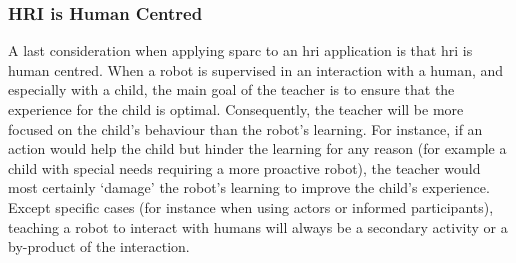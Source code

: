 \subsubsection{HRI is Human Centred}

A last consideration when applying \gls{sparc} to an \gls{hri} application is that \gls{hri} is human centred. When a robot is supervised in an interaction with a human, and especially with a child, the main goal of the teacher is to ensure that the experience for the child is optimal. Consequently, the teacher will be more focused on the child's behaviour than the robot's learning. For instance, if an action would help the child but hinder the learning for any reason (for example a child with special needs requiring a more proactive robot), the teacher would most certainly `damage' the robot's learning to improve the child's experience. Except specific cases (for instance when using actors or informed participants), teaching a robot to interact with humans will always be a secondary activity or a by-product of the interaction. 

